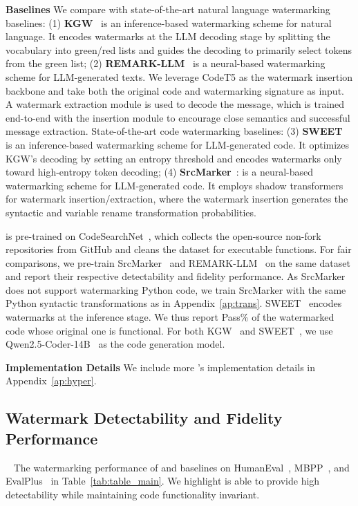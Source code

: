 \textbf{Baselines}  We compare \sys{} with state-of-the-art natural language watermarking baselines: (1) \textbf{KGW}~\cite{kirchenbauer2023watermark} is an inference-based watermarking scheme for natural language. It encodes watermarks at the LLM decoding stage by splitting the vocabulary into green/red lists and guides the decoding to primarily select tokens from the green list; (2) \textbf{REMARK-LLM}~\cite{zhang2024remark} is a neural-based watermarking scheme for LLM-generated texts. We leverage CodeT5 as the watermark insertion backbone and take both the original code and watermarking signature as input. A watermark extraction module is used to decode the message, which is trained end-to-end with the insertion module to encourage close semantics and successful message extraction.
State-of-the-art code watermarking baselines: (3) \textbf{SWEET}~\cite{lee2023wrote} is an inference-based watermarking scheme for LLM-generated code. It optimizes KGW's decoding by setting an entropy threshold and encodes watermarks only toward high-entropy token decoding; (4) \textbf{SrcMarker}~\cite{yang2024srcmarker}: is a neural-based watermarking scheme for LLM-generated code. It employs shadow transformers for watermark insertion/extraction, where the watermark insertion generates the syntactic and variable rename transformation probabilities. 

\sys{} is pre-trained on CodeSearchNet~\cite{husain2019codesearchnet}, which collects the open-source non-fork repositories from GitHub and cleans the dataset for executable functions. 
For fair comparisons, we pre-train SrcMarker~\cite{yang2024srcmarker} and REMARK-LLM~\cite{zhang2024remark} on the same dataset and report their respective detectability and fidelity performance. 
As SrcMarker does not support watermarking Python code, we train SrcMarker with the same Python syntactic transformations as \sys{} in Appendix~\ref{ap:trans}.
SWEET~\cite{lee2023wrote} encodes watermarks at the inference stage. We thus report Pass\% of the watermarked code whose original one is functional. For both KGW~\cite{kirchenbauer2023watermark} and SWEET~\cite{lee2023wrote}, we use Qwen2.5-Coder-14B~\cite{hui2024qwen2} as the code generation model.

\textbf{Implementation Details} We include more \sys's implementation details in Appendix~\ref{ap:hyper}.



\subsection{Watermark Detectability and Fidelity Performance}~\label{subsec:wm_perform}
The watermarking performance of \sys{} and baselines on HumanEval~\cite{chen2021evaluating}, MBPP~\cite{austin2021program}, and EvalPlus~\cite{evalplus} in Table~\ref{tab:table_main}.
We highlight \sys{} is able to provide high detectability while maintaining code functionality invariant.  


